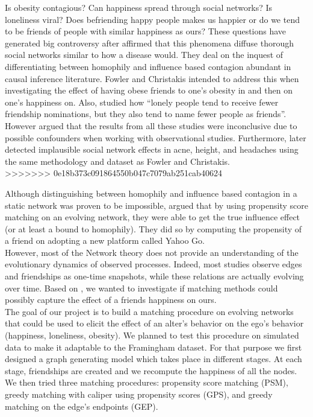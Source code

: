 \documentclass[11pt]{article}
\begin{document}
Is obesity contagious? Can happiness spread through social networks? Is loneliness viral? Does befriending happy people makes us happier or do we tend to be friends of people with similar happiness as ours? These questions have generated big controversy after \cite{christakis2007spread} affirmed that this phenomena diffuse thorough social networks similar to how a disease would. They deal on  the inquest of differentiating between homophily and influence based contagion abundant in causal inference literature. Fowler and Christakis intended to address this when investigating the effect of having obese friends to one’s obesity in \citep{christakis2007spread} and then on one’s happiness on. Also, \citep{cacioppo2009alone} studied how “lonely people tend to receive fewer friendship nominations, but they also tend to name fewer people as friends”. However \citep{shalizi2011homophily} argued that the results from all these studies were inconclusive due to possible confounders when working with observational studies. Furthermore, \citep{cohen2008detecting} later detected implausible social network effects in acne, height, and headaches using the same methodology and dataset as Fowler and Christakis. \\
>>>>>>> 0e18b373c091864550b047c7079ab251cab40624

Although distinguishing between homophily and influence based contagion in a static network was proven to be impossible, \cite{aral2009distinguishing} argued that by using propensity score matching on an evolving network, they were able to get the true influence effect (or at least a bound to homophily). They did so by computing the propensity of a friend on adopting a new platform called Yahoo Go.\\

However, most of the Network theory does not provide an understanding of the evolutionary dynamics of observed processes. Indeed, most studies observe edges and friendships as one-time snapshots, while these relations are actually evolving over time. Based on \cite{aral2009distinguishing}, we wanted to investigate if matching methods could possibly capture the effect of a friends happiness on ours.\\

The goal of our project is to build a matching procedure on evolving networks that could be used to elicit the effect of an alter’s behavior on the ego’s behavior (happiness, loneliness, obesity). We planned to test this procedure on simulated data to make it adaptable to the Framingham dataset. For that purpose we first designed a graph generating model which takes place in different stages. At each stage, friendships are created and we recompute the happiness of all the nodes. We then tried three matching procedures: propensity score matching (PSM), greedy matching with caliper using propensity scores (GPS), and greedy matching on the edge’s endpoints (GEP).\\
\end{document}
